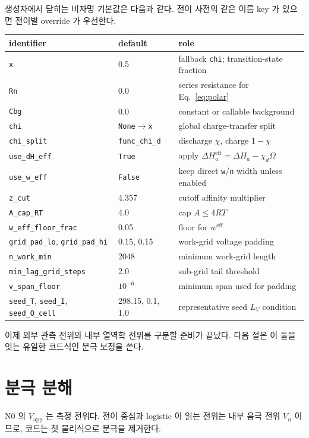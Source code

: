 \documentclass[11pt,a4paper]{article}
\newcommand{\app}{\mathrm{app}}
\newcommand{\eff}{\mathrm{eff}}
\begin{document}
생성자에서 닫히는 비자명 기본값은 다음과 같다. 전이 사전의 같은 이름 key 가 있으면 전이별 override 가 우선한다.
\begin{center}
\renewcommand{\arraystretch}{1.18}
\begin{tabular}{lll}
\toprule
identifier & default & role\\
\midrule
\texttt{x} & 0.5 & fallback \texttt{chi}; transition-state fraction\\
\texttt{Rn} & 0.0 & series resistance for Eq.~\eqref{eq:polar}\\
\texttt{Cbg} & 0.0 & constant or callable background\\
\texttt{chi} & \texttt{None}$\to$\texttt{x} & global charge-transfer split\\
\texttt{chi\_split} & \texttt{func\_chi\_d} & discharge $\chi$, charge $1-\chi$\\
\texttt{use\_dH\_eff} & \texttt{True} & apply $\Delta H_a^{\eff}=\Delta H_a-\chi_d\Omega$\\
\texttt{use\_w\_eff} & \texttt{False} & keep direct \texttt{w}/\texttt{n} width unless enabled\\
\texttt{z\_cut} & 4.357 & cutoff affinity multiplier\\
\texttt{A\_cap\_RT} & 4.0 & cap $A\le4RT$\\
\texttt{w\_eff\_floor\_frac} & 0.05 & floor for $w^{\eff}$\\
\texttt{grid\_pad\_lo}, \texttt{grid\_pad\_hi} & 0.15, 0.15 & work-grid voltage padding\\
\texttt{n\_work\_min} & 2048 & minimum work-grid length\\
\texttt{min\_lag\_grid\_steps} & 2.0 & sub-grid tail threshold\\
\texttt{v\_span\_floor} & $10^{-6}$ & minimum span used for padding\\
\texttt{seed\_T}, \texttt{seed\_I}, \texttt{seed\_Q\_cell} & 298.15, 0.1, 1.0 & representative seed $L_V$ condition\\
\bottomrule
\end{tabular}
\end{center}
이제 외부 관측 전위와 내부 열역학 전위를 구분할 준비가 끝났다. 다음 절은 이 둘을 잇는 유일한 코드식인 분극 보정을 쓴다.

\section{분극 분해}\label{sec:n1}
N0 의 $V_{\app}$ 는 측정 전위다. 전이 중심과 logistic 이 읽는 전위는 내부 음극 전위 $V_n$ 이므로, 코드는 첫 물리식으로 분극을 제거한다.
\end{document}

